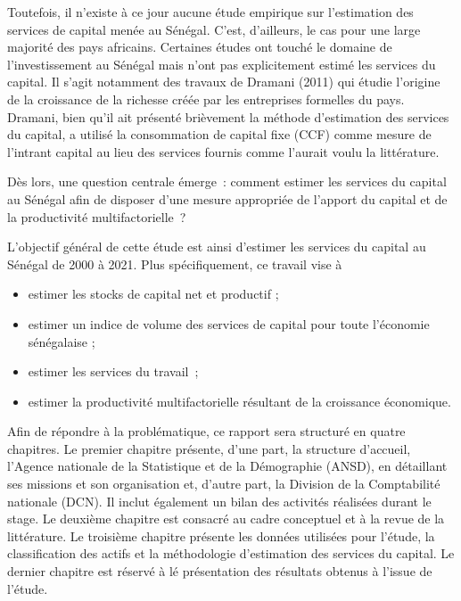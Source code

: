 \documentclass[12pt,a4paper,oneside]{report}
\begin{document}
Toutefois, il n’existe à ce jour aucune étude empirique sur l’estimation des services de capital menée au
Sénégal. C’est, d’ailleurs, le cas pour une large majorité des pays africains. Certaines études ont touché le
domaine de l’investissement au Sénégal mais n’ont pas explicitement estimé les services du capital. Il s’agit
notamment des travaux de Dramani (2011) qui étudie l’origine de la croissance de la richesse créée par les
entreprises formelles du pays. Dramani, bien qu’il ait présenté brièvement la méthode d’estimation des
services du capital, a utilisé la consommation de capital fixe (CCF) comme mesure de l’intrant capital au lieu
des services fournis comme l’aurait voulu la littérature.

Dès lors, une question centrale émerge~: comment estimer les services du capital au Sénégal afin de disposer
d’une mesure appropriée de l’apport du capital et de la productivité multifactorielle~?

L’objectif général de cette étude est ainsi d’estimer les services du capital au Sénégal de 2000 à 2021. Plus
spécifiquement, ce travail vise à

\begin{itemize}

\item estimer les stocks de capital net et productif ;

\item estimer un indice de volume des services de capital pour toute l’économie sénégalaise ;

\item estimer les services du travail~;

\item estimer la productivité multifactorielle résultant de la croissance économique.

\end{itemize}

Afin de répondre à la problématique, ce rapport sera structuré en quatre chapitres. Le premier chapitre
présente, d’une part, la structure d’accueil, l’Agence nationale de la Statistique et de la Démographie
(ANSD), en détaillant ses missions et son organisation et, d’autre part, la Division de la Comptabilité
nationale (DCN). Il inclut également un bilan des activités réalisées durant le stage. Le deuxième chapitre
est consacré au cadre conceptuel et à la revue de la littérature. Le troisième chapitre présente les données
utilisées pour l’étude, la classification des actifs et la méthodologie d’estimation des services du capital.
Le dernier chapitre est réservé à lé présentation des résultats obtenus à l’issue de l’étude.
\end{document}
